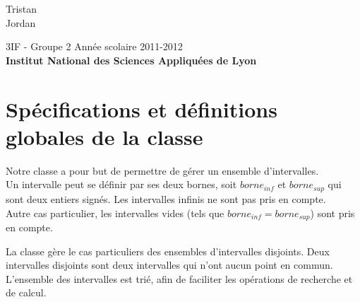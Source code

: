 \documentclass[a4paper,french,10pt,twoside]{article}
\begin{document}
\vspace{1cm}

\begin{center}
  \Large \textbf{}\\
\end{center}

\begin{center}
	\vspace*{3cm}
	\LARGE {}\\ \vspace{10pt}\large \color{black} Tristan  \\ Jordan  \\
				   \vspace*{1.5cm}

				   \vspace*{1cm}

				   \Large 3IF - Groupe 2 \hfill Ann\'ee scolaire 2011-2012\\
				   \vspace*{1cm}
				   \textbf{\Large Institut National des Sciences Appliqu\'{e}es de Lyon} \pagebreak
\end{center}

\section{Sp\'ecifications et d\'efinitions globales de la classe}

Notre classe a pour but de permettre de g\'erer un ensemble d'intervalles.\\
Un intervalle peut se d\'efinir par ses deux bornes, soit $borne_{inf}$ et $borne_{sup}$ qui sont deux entiers sign\'es. Les intervalles infinis ne sont pas pris en compte.\\ Autre cas particulier, les intervalles vides (tels que $borne_{inf}=borne_{sup}$) sont pris en compte.\newline{}

La classe gère le cas particuliers des ensembles d'intervalles disjoints. Deux intervalles disjoints sont deux intervalles qui n'ont aucun point en commun. \\

L'ensemble des intervalles est tri\'e, afin de faciliter les op\'erations de recherche et de calcul.\\
\end{document}
